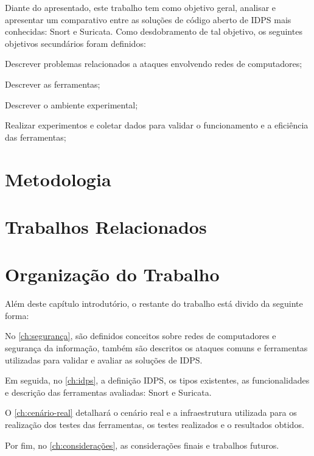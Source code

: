 Diante do apresentado, este trabalho tem como objetivo geral, analisar e apresentar um comparativo entre as soluções de código aberto de IDPS mais conhecidas: Snort e Suricata. Como desdobramento de tal objetivo, os seguintes objetivos secundários foram definidos:

\begin{alineas}
\item Descrever problemas relacionados a ataques envolvendo redes de computadores;
\item Descrever as ferramentas;
\item Descrever o ambiente experimental;
\item Realizar experimentos e coletar dados para validar o funcionamento e a eficiência das ferramentas;
\end{alineas}

\section{Metodologia} \label{sec:metodologia}
\section{Trabalhos Relacionados} \label{sec:trabalhos-relacionados}
\section{Organização do Trabalho} \label{sec:organização-do-trabalho}

Além deste capítulo introdutório, o restante do trabalho está divido da seguinte forma:

No \autoref{ch:segurança}, são definidos conceitos sobre redes de computadores e segurança da informação, também são descritos os ataques comuns e ferramentas utilizadas para validar e avaliar as soluções de IDPS.

Em seguida, no \autoref{ch:idps}, a definição IDPS, os tipos existentes, as funcionalidades e descrição das ferramentas avaliadas: Snort e Suricata.

O \autoref{ch:cenário-real} detalhará o cenário real e a infraestrutura utilizada para os realização dos testes das ferramentas, os testes realizados e o resultados obtidos.

Por fim, no \autoref{ch:considerações}, as considerações finais e trabalhos futuros.
